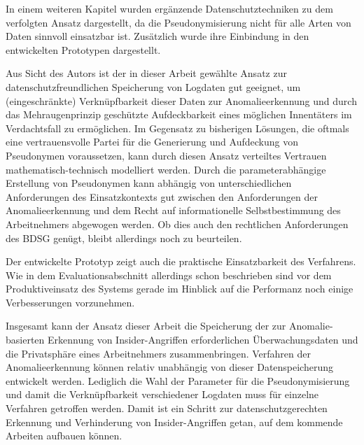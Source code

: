 In einem weiteren Kapitel wurden ergänzende Datenschutztechniken zu dem verfolgten Ansatz dargestellt, da die Pseudonymisierung nicht für alle Arten von Daten sinnvoll einsatzbar ist. Zusätzlich wurde ihre Einbindung in den entwickelten Prototypen dargestellt.

Aus Sicht des Autors ist der in dieser Arbeit gewählte Ansatz zur datenschutzfreundlichen Speicherung von Logdaten gut geeignet, um (eingeschränkte) Verknüpfbarkeit dieser Daten zur Anomalieerkennung und durch das Mehraugenprinzip geschützte Aufdeckbarkeit eines möglichen Innentäters im Verdachtsfall zu ermöglichen. Im Gegensatz zu bisherigen Lösungen, die oftmals eine vertrauensvolle Partei für die Generierung und Aufdeckung von Pseudonymen voraussetzen, kann durch diesen Ansatz verteiltes Vertrauen mathematisch-technisch modelliert werden. Durch die parameterabhängige Erstellung von Pseudonymen kann 
abhängig von unterschiedlichen Anforderungen des Einsatzkontexts gut zwischen den Anforderungen der Anomalieerkennung und dem Recht auf informationelle Selbstbestimmung des Arbeitnehmers abgewogen werden. Ob dies auch den rechtlichen Anforderungen des BDSG genügt, bleibt allerdings noch zu beurteilen.

Der entwickelte Prototyp zeigt auch die praktische Einsatzbarkeit des Verfahrens. Wie in dem Evaluationsabschnitt allerdings schon beschrieben sind vor dem Produktiveinsatz des Systems gerade im Hinblick auf die Performanz noch einige Verbesserungen vorzunehmen.

Insgesamt kann der Ansatz dieser Arbeit die Speicherung der zur Anomalie-basierten Erkennung von Insider-Angriffen erforderlichen Überwachungsdaten und die Privatsphäre eines Arbeitnehmers zusammenbringen. Verfahren der Anomalieerkennung können relativ unabhängig von dieser Datenspeicherung entwickelt werden. Lediglich die Wahl der Parameter für die Pseudonymisierung und damit die Verknüpfbarkeit verschiedener Logdaten muss für einzelne Verfahren getroffen werden. Damit ist ein Schritt zur datenschutzgerechten Erkennung und Verhinderung von Insider-Angriffen getan, auf dem kommende Arbeiten aufbauen können.


